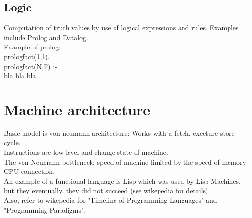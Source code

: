     \subsection{Logic}
    Computation of truth values by use of logical expressions and rules. Examples include Prolog and Datalog. \\
    Example of prolog: \\
    prologfact(1,1). \\
    prologfact(N,F) :- \\ bla bla bla
    \section{Machine architecture}
    Basic model is von neumann architecture:
    Works with a fetch, execture store cycle. \\
    Instructions are low level and change state of machine.  \\
    The von Neumann bottleneck: speed of machine limited by the speed of memory-CPU connection. \\
    An example of a functional language is Lisp which was used by Lisp Machines, but they eventually, they did not succeed (see wikepedia for details). \\
    Also, refer to wikepedia for "Timeline of Programming Languages" and "Programming Paradigms". \\